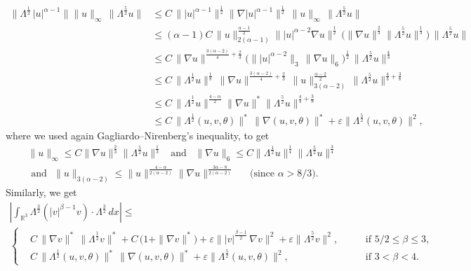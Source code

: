 \documentclass[a4paper]{article}
\newcommand{\dx}{\, dx}
\newcommand{\R}{\mathbb{R}}
\begin{document}
\begin{equation*}
  \begin{aligned}
    \|\Lambda^{\frac{1}{2}}\,|u|^{\alpha-1}\|\|u\|_\infty \,
    \|\Lambda^{\frac{5}{2}}u\|&\le C\, \|
    |u|^{\alpha-1}\|^{\frac{1}{2}} \|\nabla
    |u|^{\alpha-1}\|^{\frac{1}{2}}\, \| u\|_{\infty}\,
    \|\Lambda^{\frac{5}{2}}u\|
    \\
    &\le (\alpha-1)C\,\|u\|_{2(\alpha-1)}^{\frac{\alpha-1}{2}} \|
    |u|^{\alpha-2}\nabla u\|^{\frac{1}{2}} \,\big(\|\nabla
    u\|^{\frac{2}{3}}\|\Lambda^{\frac{5}{2}}u\|^{\frac{1}{3}}\big)\,
    \|\Lambda^{\frac{5}{2}}u\|
    \\
    &\le C\,\|\nabla u\|^{\frac{3(\alpha-2)}{4}+
      \frac{2}{3}}\big(\||u|^{\alpha-2}\|_3 \,\|\nabla
    u\|_6\big)^{\frac{1}{2}}\,
    \|\Lambda^{\frac{5}{2}}u\|^{\frac{4}{3}}
    \\
    &\le C\,\|\Lambda^{\frac{1}{2}}u\|^{\frac{1}{8}}\,\|\nabla
    u\|^{\frac{3(\alpha-2)}{4}+\frac{2}{3}}\,
    \|u\|_{3(\alpha-2)}^{\frac{\alpha-2}{2}}\,\|\Lambda^{\frac{5}{2}}u\|^{\frac{4}{3}+\frac{3}{8}}
    \\
    &\le C\, \|\Lambda^{\frac{1}{2}}u\|^{\frac{4-\alpha}{2}}\|\nabla
    u\|^{*} \|\Lambda^{\frac{5}{2}}u\|^{\frac{4}{3}+\frac{3}{8}}
    \\
    &\leq C\, \|\Lambda^\frac12 (u,v,\theta)\|^{*}\, \|\nabla
    (u,v,\theta)\|^{*}+ \varepsilon \|\Lambda^\frac52
    (u,v,\theta)\|^2,
  \end{aligned}
\end{equation*}
where we used again Gagliardo--Nirenberg's inequality, to get
\begin{gather*}
  \|u\|_\infty \leq C \|\nabla
  u\|^{\frac{2}{3}}\|\Lambda^{\frac{5}{2}}u\|^{\frac{1}{3}}\,\,\,
  \textrm{ and }\,\,\, \|\nabla u\|_6 \leq C
  \|\Lambda^{\frac{1}{2}}u\|^{\frac{1}{4}}\|\Lambda^{\frac{5}{2}}
  u\|^{\frac{3}{4}} 
  \\
  \textrm{ and }\,\, \|u\|_{3(\alpha-2)}\leq
  \|u\|^{\frac{4-\alpha}{2(\alpha-2)}}\|\nabla
  u\|^{\frac{3\alpha-8}{2(\alpha-2)}} \,\,\,\,\,\,\, \mbox{ (since
    $\alpha>8/3$)}.
\end{gather*}
%
Similarly, we get
%
\begin{multline*}
  \left| \int_{\R^3}\Lambda^{\frac{3}{2}}(|v|^{\beta-1}v)\cdot
    \Lambda^{\frac{3}{2}}  \dx \right| \leq
    \\
  \left\{
    \begin{aligned}
      &C\,\|\nabla v\|^{*} \,\|\Lambda^\frac12 v\|^{*}+ C\, \big(1+
      \|\nabla v\|^*\big)+ \varepsilon \||v|^\frac{\beta-1}{2}\,
      \nabla v\|^2+ \varepsilon \|\Lambda^\frac52 v\|^2, \,\,\,\,\,
      &&\mbox{ if $5/2\leq\beta \le 3$},
      \\
      &C\, \|\Lambda^\frac12 (u,v,\theta)\|^{*}\, \|\nabla
      (u,v,\theta)\|^{*}+ \varepsilon \|\Lambda^\frac52
      (u,v,\theta)\|^2, \,\,\,\,\, &&\mbox{ if $3< \beta <4$}.
    \end{aligned}
  \right.
\end{multline*}
\end{document}

